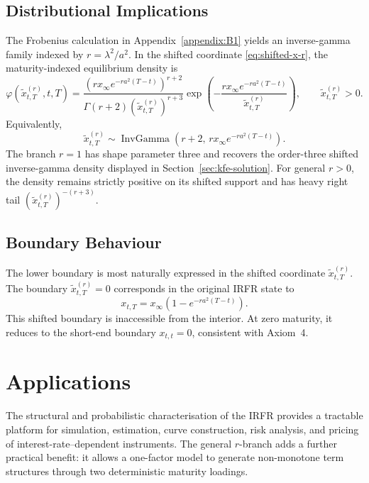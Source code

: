 \documentclass[12pt]{article}
\theoremstyle{statementstyle}
\begin{document}
\subsection{Distributional Implications}
\label{subsec:distributional}

The Frobenius calculation in Appendix~\ref{appendix:B1} yields an
inverse-gamma family indexed by \(r=\lambda^{2}/a^{2}\). In the shifted
coordinate \eqref{eq:shifted-x-r}, the maturity-indexed equilibrium
density is
\begin{equation}
\varphi(\widetilde{x}_{t,T}^{(r)},t,T)
=
\frac{
\left(r x_{\infty}e^{-ra^{2}(T-t)}\right)^{r+2}
}{
\Gamma(r+2)\left(\widetilde{x}_{t,T}^{(r)}\right)^{r+3}
}
\exp\!\left(
-\frac{r x_{\infty}e^{-ra^{2}(T-t)}}
{\widetilde{x}_{t,T}^{(r)}}
\right),
\qquad
\widetilde{x}_{t,T}^{(r)}>0.
\tag{6.4.1}\label{eq:long-time-limit-density-interpretation}
\end{equation}
Equivalently,
\[
\widetilde{x}_{t,T}^{(r)}
\sim
\operatorname{InvGamma}\left(r+2,\,
 r x_{\infty}e^{-ra^{2}(T-t)}\right).
\]
The branch \(r=1\) has shape parameter three and recovers the
order-three shifted inverse-gamma density displayed in
Section~\ref{sec:kfe-solution}. For general \(r>0\), the density remains
strictly positive on its shifted support and has heavy right tail
\((\widetilde{x}_{t,T}^{(r)})^{-(r+3)}\).

\subsection{Boundary Behaviour}
\label{subsec:econ-boundary}

The lower boundary is most naturally expressed in the shifted coordinate
\(\widetilde{x}_{t,T}^{(r)}\). The boundary
\(\widetilde{x}_{t,T}^{(r)}=0\) corresponds in the original IRFR state to
\[
x_{t,T}
=
x_{\infty}\left(1-e^{-ra^{2}(T-t)}\right).
\]
This shifted boundary is inaccessible from the interior. At zero
maturity, it reduces to the short-end boundary \(x_{t,t}=0\), consistent
with Axiom~4.

\section{Applications}
\label{sec:applications}

The structural and probabilistic characterisation of the IRFR provides
a tractable platform for simulation, estimation, curve construction,
risk analysis, and pricing of interest-rate--dependent instruments. The
general \(r\)-branch adds a further practical benefit: it allows a
one-factor model to generate non-monotone term structures through two
deterministic maturity loadings.
\end{document}
